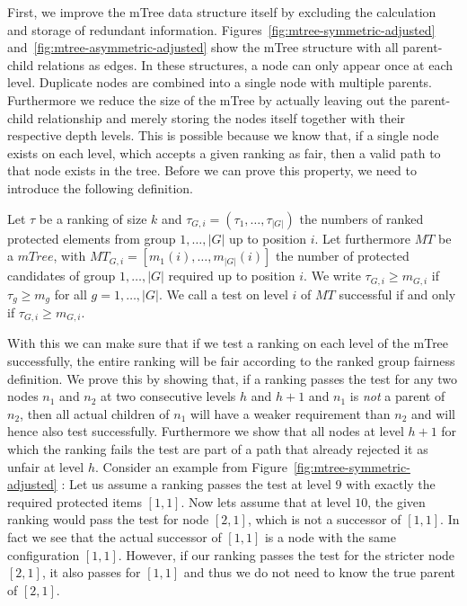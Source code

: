 First, we improve the mTree data structure itself by excluding the calculation and storage of redundant information.
%
Figures~\ref{fig:mtree-symmetric-adjusted} and~\ref{fig:mtree-asymmetric-adjusted} show the mTree structure with all parent-child relations as edges.
%
In these structures, a node can only appear once at each level. Duplicate nodes are combined into a single node with multiple parents.
%
Furthermore we reduce the size of the mTree by actually leaving out the parent-child relationship and merely storing the nodes itself together with their respective depth levels.
%
This is possible because we know that, if a single node exists on each level, which accepts a given ranking as fair, then a valid path to that node exists in the tree.
%
Before we can prove this property, we need to introduce the following definition.
%
\begin{definition}
\label{def:valid-mtree-test}
Let $\tau$ be a ranking of size $k$ and $\tau_{G,i}=(\tau_{1},\ldots,\tau_{|G|})$ the numbers of ranked protected elements from group $1,\ldots,|G|$ up to position $i$.
%
Let furthermore $MT$ be a $mTree$, with $MT_{G,i}=[m_1(i),\ldots,m_{|G|}(i)]$ the number of protected candidates of group $1,\ldots,|G|$ required up to position $i$.
%
We write $\tau_{G,i} \geq m_{G,i}$ if $\tau_g \geq m_g$ for all $g=1,\ldots,|G|$.
%
We call a test on level $i$ of $MT$ successful if and only if $\tau_{G,i} \geq m_{G,i}$.
\end{definition}
%
\noindent With this we can make sure that if we test a ranking on each level of the mTree successfully, the entire ranking will be fair according to the ranked group fairness definition.
%
We prove this by showing that, if a ranking passes the test for any two nodes $n_1$ and $n_2$ at two consecutive levels $h$ and $h+1$ and $n_1$ is \emph{not} a parent of $n_2$, then all actual children of $n_1$ will have a weaker requirement than $n_2$ and will hence also test successfully.
%
Furthermore we show that all nodes at level $h+1$ for which the ranking fails the test are part of a path that already rejected it as unfair at level $h$.
%
Consider an example from Figure~\ref{fig:mtree-symmetric-adjusted} : Let us assume a ranking passes the test at level $9$ with exactly the required protected items $[1,1]$.
%
Now lets assume that at level $10$, the given ranking would pass the test for node $[2,1]$, which is not a successor of $[1,1]$.
%
In fact we see that the actual successor of $[1,1]$ is a node with the same configuration $[1,1]$.
%
However, if our ranking passes the test for the stricter node $[2,1]$, it also passes for $[1,1]$ and thus we do not need to know the true parent of $[2,1]$.
